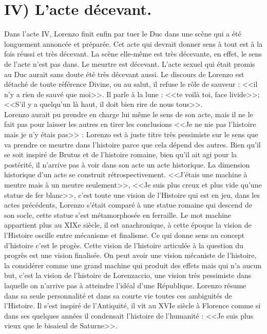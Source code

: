 \documentclass[12pt]{article}
\begin{document}
\section*{\color{red}IV) L'acte décevant.}
Dans l'acte IV, Lorenzo finit enfin par tuer le Duc dans une scène qui a été longuement annoncée et préparée.
Cet acte qui devrait donner sens à tout est à la fois réussi et très décevant.
La scène elle-même est très décevante, en effet, le sens de l'acte n'est pas dans.
Le meurtre est décevant. L'acte sexuel qui était promis au Duc aurait sans doute été très décevant aussi.
Le discours de Lorenzo est détaché de toute référence Divine, ou au salut, il refuse le rôle de sauveur : <<il n'y a rien de sauvé que moi>>. Il parle à la lune : <<te voilà toi, face livide>>; <<S'il y a quelqu'un là haut, il doit bien rire de nous tous>>.\\
Lorenzo aurait pu prendre en charge lui même le sens de son acte, mais il ne le fait pas pour laisser les autres en tirer les conclusions <<Je ne nie pas l'histoire mais je n'y étais pas>> : Lorenzo est à juste titre très pessimiste sur le sens que va prendre ce meurtre dans l'histoire parce que cela dépend des autres.
Bien qu'il se soit inspiré de Brutus et de l'histoire romaine, bien qu'il ait agi pour la postérité, il n'arrive pas à voir dans son acte un acte historique.
La dimension historique d'un acte se construit rétrospectivement. 
<<J'étais une machine à meutre mais à un meutre seulement>>, <<Je suis plus creux et plus vide qu'une statue de fer blanc>>, c'est toute une vision de l'Histoire qui est en jeu, dans les actes précédents, Lorenzo s'était comparé à une statue romaine qui descend de son socle, cette statue s'est métamorphosée en ferraille.
Le mot machine appartient plus au XIXe siècle, il est anachronique, à cette époque la vision de l'Histoire oscille entre mécanisme et finalisme. Ce qui donne sens au concept d'histoire c'est le progès.
Cette vision de l'histoire articulée à la question du progrès est une vision finalisée. On peut avoir une vision mécaniste de l'histoire, la considérer comme une grand machine qui produit des effets mais qui n'a aucun but, c'est la vision de l'histoire de Lorenzaccio, une vision très pessimiste dans laquelle on n'arrive pas à atteindre l'idéal d'une République.
Lorenzo résume dans sa seule personnalité et dans sa courte vie toutes ces ambiguités de l'Histoire.
Il s'est inspiré de l'Antiquité, il vit au XVIe siècle à Florence comme si dans ses quelques années il condensait l'histoire de l'humanité : <<Je suis plus vieux que le bisaieul de Saturne>>.
\end{document}
